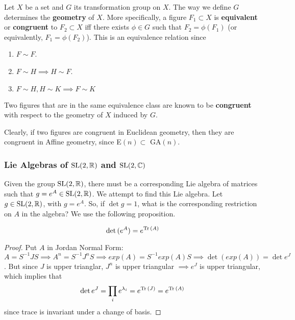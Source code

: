   \begin{definition}
    Let $X$ be a set and $G$ its transformation group on $X$. The way we define $G$ determines the \textbf{geometry} of $X$. More specifically, a figure $F_{1} \subset X$ is \textbf{equivalent} or \textbf{congruent} to $F_{2} \subset X$ iff there exists $\phi \in G$ such that $F_{2} = \phi (F_{1})$ (or equivalently, $F_{1} = \phi (F_{2})$). This is an equivalence relation since
    \begin{enumerate}
      \item $F \sim F$. 
      \item $F \sim H \implies H \sim F$. 
      \item $F \sim H, H \sim K \implies F \sim K$
    \end{enumerate}
    Two figures that are in the same equivalence class are known to be \textbf{congruent} with respect to the geometry of $X$ induced by $G$. 
  \end{definition}

  Clearly, if two figures are congruent in Euclidean geometry, then they are congruent in Affine geometry, since E$(n) \subset$ GA$(n)$. 


\subsubsection[Lie Algebras of SL(2, R) and SL(2, C)]{Lie Algebras of $\SL(2, \mathbb{R})$ and $\SL(2, \mathbb{C})$}

  Given the group $\SL(2, \mathbb{R})$, there must be a corresponding Lie algebra of matrices such that $g = e^A \in \SL(2, \mathbb{R})$. We attempt to find this Lie algebra. Let $g \in \SL(2, \mathbb{R})$, with $g = e^A$. So, if $\det{g} = 1$, what is the corresponding restriction on $A$ in the algebra? We use the following proposition. 

  \begin{proposition}
    \begin{equation}
      \det{(e^A)} = e^{\Tr{(A)}}
    \end{equation}
  \end{proposition}
  \begin{proof}
    Put $A$ in Jordan Normal Form: $A = S^{-1} J S \implies A^n = S^{-1} J^n S \implies exp(A) = S^{-1} exp(A) S \implies \det{(exp(A))} = \det{e^J}$. But since $J$ is upper trianglar, $J^n$ is upper triangular $\implies e^J$ is upper triangular, which implies that 
    \begin{equation}
      \det{e^J} = \prod_i e^{\lambda_i} = e^{\Tr{(J)}} = e^{\Tr{(A)}}
    \end{equation}
    since trace is invariant under a change of basis. 
  \end{proof}

